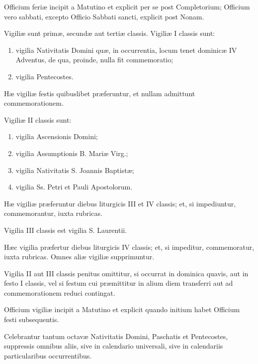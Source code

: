 \documentclass[vesperale_romanum.tex]{subfiles}
\begin{document}
Officium feriæ incipit a Matutino et explicit per se post Completorium; Officium vero sabbati, excepto Officio Sabbati sancti, explicit post Nonam.


Vigiliæ sunt primæ, secundæ aut tertiæ classis. Vigiliæ I classis sunt:

\begin{enumerate}[nosep,label=\alph*.]
\item  vigilia Nativitatis Domini quæ, in occurrentia, locum tenet dominicæ IV Adventus, de qua, proinde, nulla fit commemoratio;
\item vigilia Pentecostes.
\end{enumerate}

Hæ vigiliæ festis quibuslibet præferuntur, et nullam admittunt commemorationem.

Vigiliæ II classis sunt:

\begin{enumerate}[nosep,label=\alph*.]
\item vigilia Ascensionis Domini;

\item vigilia Assumptionis B. Mariæ Virg.;

\item vigilia Nativitatis S. Joannis Baptistæ;

\item vigilia Ss. Petri et Pauli Apostolorum.
\end{enumerate}

Hæ vigiliæ præferuntur diebus liturgicis III et IV classis; et, si impediuntur, commemorantur, iuxta rubricas.

Vigilia III classis est vigilia S. Laurentii.

Hæc vigilia præfertur diebus liturgicis IV classis; et, si impeditur, commemoratur, iuxta rubricas. Omnes aliæ vigiliæ supprimuntur.

Vigilia II aut III classis penitus omittitur, si occurrat in dominica quavis, aut in festo I classis, vel si festum cui præmittitur in alium diem transferri aut ad commemorationem reduci contingat.

Officium vigiliæ incipit a Matutino et explicit quando initium habet Officium festi subsequentis.

Celebrantur tantum octavæ Nativitatis Domini, Paschatis et Pentecostes, suppressis omnibus aliis, sive in calendario universali, sive in calendariis particularibus occurrentibus. 
\end{document}
